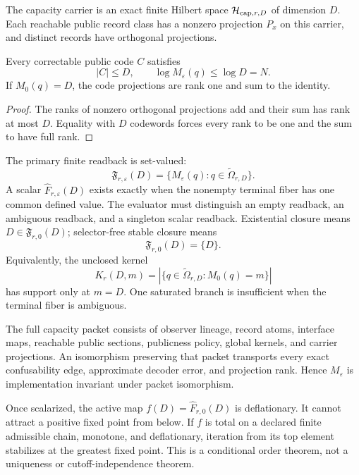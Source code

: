 The capacity carrier is an exact finite Hilbert space
\(\mathcal H_{{\rm cap},r,D}\) of dimension \(D\). Each reachable public
record class has a nonzero projection \(P_x\) on this carrier, and distinct
records have orthogonal projections.

\begin{theorem}
\label{thm:public-capacity-carrier-bound}
Every correctable public code \(C\) satisfies
\[
|C|\le D,
\qquad
\log M_\varepsilon(q)\le\log D=N.
\]
If \(M_0(q)=D\), the code projections are rank one and sum to the identity.
\end{theorem}

\begin{proof}
The ranks of nonzero orthogonal projections add and their sum has rank at
most \(D\). Equality with \(D\) codewords forces every rank to be one and
the sum to have full rank.
\end{proof}

The primary finite readback is set-valued:
\[
\boxed{
\mathfrak F_{r,\varepsilon}(D)=
\{M_\varepsilon(q):q\in\widetilde\Omega_{r,D}\}.
}
\]
A scalar \(\widehat F_{r,\varepsilon}(D)\) exists exactly when the nonempty
terminal fiber has one common defined value. The evaluator must distinguish
an empty readback, an ambiguous readback, and a singleton scalar readback.
Existential closure means \(D\in\mathfrak F_{r,0}(D)\); selector-free stable
closure means
\[
\boxed{\mathfrak F_{r,0}(D)=\{D\}.}
\]
Equivalently, the unclosed kernel
\[
K_r(D,m)=
|\{q\in\widetilde\Omega_{r,D}:M_0(q)=m\}|
\]
has support only at \(m=D\). One saturated branch is insufficient when the
terminal fiber is ambiguous.

The full capacity packet consists of observer lineage, record atoms,
interface maps, reachable public sections, publicness policy, global kernels,
and carrier projections. An isomorphism preserving that packet transports
every exact confusability edge, approximate decoder error, and projection
rank. Hence \(M_\varepsilon\) is implementation invariant under packet
isomorphism.

Once scalarized, the active map
\(f(D)=\widehat F_{r,0}(D)\) is deflationary. It cannot attract a positive
fixed point from below. If \(f\) is total on a declared finite admissible
chain, monotone, and deflationary, iteration from its top element stabilizes
at the greatest fixed point. This is a conditional order theorem, not a
uniqueness or cutoff-independence theorem.

